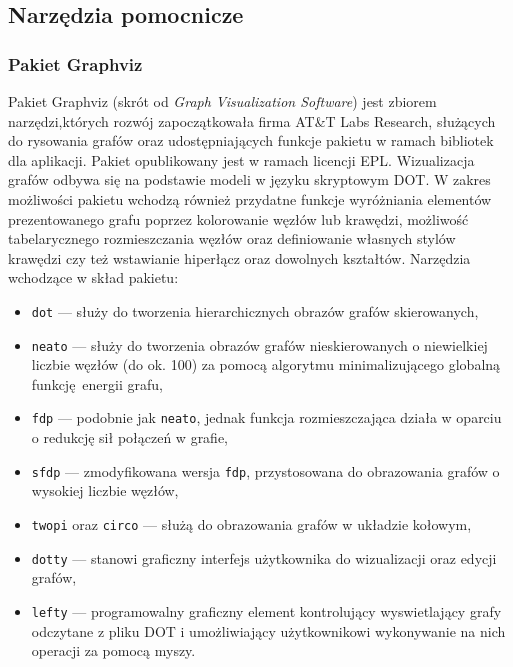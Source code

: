 \subsection{Narzędzia pomocnicze}
\label{ss_technologies_misc}
\subsubsection{\textbf{Pakiet Graphviz}}
\label{sss_technologies_misc_graphviz}
\par{
  Pakiet Graphviz (skrót od \emph{Graph Visualization Software}) jest zbiorem narzędzi,których rozwój zapoczątkowała firma AT\&T Labs Research, służących do rysowania grafów oraz udostępniających funkcje pakietu w ramach bibliotek dla aplikacji.
  Pakiet opublikowany jest w ramach licencji EPL.
  Wizualizacja grafów odbywa się na podstawie modeli w języku skryptowym DOT.
  W zakres możliwości pakietu wchodzą również przydatne funkcje wyróżniania elementów prezentowanego grafu poprzez kolorowanie węzłów lub krawędzi, możliwość tabelarycznego rozmieszczania węzłów oraz definiowanie własnych stylów krawędzi czy też wstawianie hiperłącz oraz dowolnych kształtów.
  Narzędzia wchodzące w skład pakietu:
  \begin{itemize}
    \item \texttt{dot} --- służy do tworzenia hierarchicznych obrazów grafów skierowanych,
    \item \texttt{neato} --- służy do tworzenia obrazów grafów nieskierowanych o niewielkiej liczbie węzłów (do ok. 100) za pomocą algorytmu minimalizującego globalną funkcję energii grafu,
    \item \texttt{fdp} --- podobnie jak \texttt{neato}, jednak funkcja rozmieszczająca działa w oparciu o redukcję sił połączeń w grafie,
    \item \texttt{sfdp} --- zmodyfikowana wersja \texttt{fdp}, przystosowana do obrazowania grafów o wysokiej liczbie węzłów,
    \item \texttt{twopi} oraz \texttt{circo} --- służą do obrazowania grafów w układzie kołowym,
    \item \texttt{dotty} --- stanowi graficzny interfejs użytkownika do wizualizacji oraz edycji grafów,
    \item \texttt{lefty} --- programowalny graficzny element kontrolujący wyswietlający grafy odczytane z pliku DOT i umożliwiający użytkownikowi wykonywanie na nich operacji za pomocą myszy.
  \end{itemize}
}
